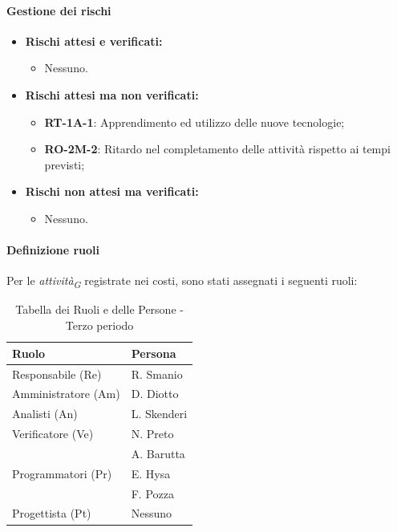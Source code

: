 \paragraph{Gestione dei rischi} 

\begin{itemize}
    \item \textbf{Rischi attesi e verificati:}
\begin{itemize}
    \item Nessuno.
\end{itemize}
\item \textbf{Rischi attesi ma non verificati:}
 \begin{itemize}
    \item \textbf{RT-1A-1}: Apprendimento ed utilizzo delle nuove tecnologie;
    \item \textbf{RO-2M-2}: Ritardo nel completamento delle attività rispetto ai tempi previsti;
\end{itemize}
\item \textbf{Rischi non attesi ma verificati:}
\begin{itemize}
    \item Nessuno.
\end{itemize}
\end{itemize}
\paragraph{Definizione ruoli} \hspace{1pt}
Per le \textit{attività}\textsubscript{\textit{G}} registrate nei costi, sono stati assegnati i seguenti ruoli:  

\begin{table}[H]
    \centering
    \begin{tabular}{|L{4cm}|L{2cm}|}
    \hline
    \textbf{Ruolo} & \textbf{Persona} \\
    \hline
    \hline
    Responsabile (Re)   & R. Smanio \\
    \hline
    Amministratore (Am) & D. Diotto \\
    \hline
    Analisti (An)       & L. Skenderi \\
    \hline
    Verificatore (Ve)   & N. Preto \\
                        & A. Barutta \\
    \hline
    Programmatori (Pr)  & E. Hysa \\
                        & F. Pozza \\
    \hline
    Progettista (Pt)    & Nessuno \\
    \hline
    \end{tabular}
    \caption{Tabella dei Ruoli e delle Persone - Terzo periodo}
    \label{tab:Ruoli_persone_3}
    \end{table}

